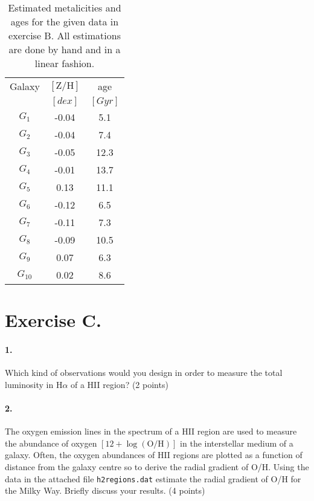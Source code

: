 \documentclass[11pt,a4paper,twoside]{article}
\newcommand{\ZH}{\ensuremath{[\text{Z}/\text{H}]} }
\begin{document}
\begin{table}[h!]
\centering
\begin{tabular}{ccc}\toprule
Galaxy  & \ZH           & age               \\
        & $[\si{dex}]$  & $[\si{Gyr}]$      \\ \midrule
$G_1$   & -0.04         & 5.1				\\
$G_2$   & -0.04	        & 7.4				\\
$G_3$   & -0.05	        & 12.3				\\
$G_4$   & -0.01	        & 13.7				\\
$G_5$   & 0.13	        & 11.1				\\
$G_6$   & -0.12	        & 6.5				\\
$G_7$   & -0.11	        & 7.3				\\
$G_8$   & -0.09	        & 10.5				\\
$G_9$   & 0.07	        & 6.3				\\
$G_{10}$& 0.02	        & 8.6				\\
\bottomrule
\end{tabular}
\caption{Estimated metalicities and ages for the given data in
exercise B. All estimations are done by hand and in a linear 
fashion.}
\label{tab:am}
\end{table}


\section*{Exercise C.}

\paragraph{1.} Which kind of observations would you design in order to measure the total luminosity in $\text{H}\alpha$ of a HII region? (2 points) \\


\paragraph{2.} The oxygen emission lines in the spectrum of a HII region are used to measure the abundance of oxygen $ \left[12 + \log{\left( \text{O/H} \right)} \right]$ in the interstellar medium of a galaxy. Often, the oxygen abundances of HII regions are plotted as a function of distance from the galaxy centre so to derive the radial gradient of O/H. Using the data in the attached file \verb+h2regions.dat+ estimate the radial gradient of O/H for the Milky Way. Briefly discuss your results. (4 points) \\
\end{document}
